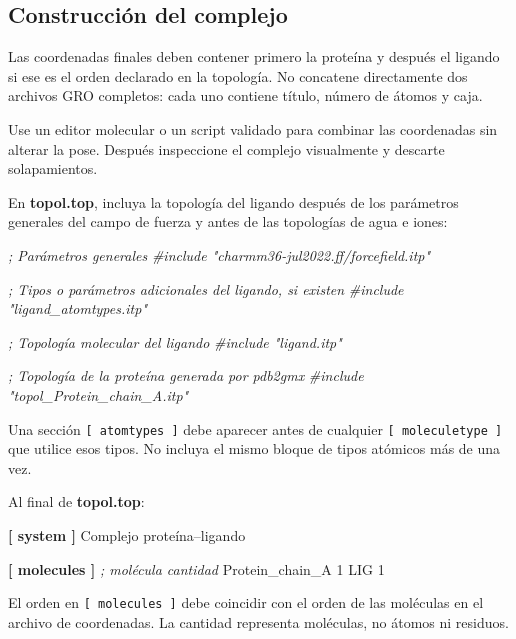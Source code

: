 \documentclass[
  spanish,
  11pt,
  a4paper]{article}
\newenvironment{Shaded}{\begin{snugshade}}{\end{snugshade}}
\newcommand{\CommentTok}[1]{\textcolor[rgb]{0.56,0.35,0.01}{\textit{#1}}}
\newcommand{\DataTypeTok}[1]{\textcolor[rgb]{0.13,0.29,0.53}{#1}}
\newcommand{\KeywordTok}[1]{\textcolor[rgb]{0.13,0.29,0.53}{\textbf{#1}}}
\begin{document}
\subsection{Construcción del
complejo}\label{construcciuxf3n-del-complejo}

Las coordenadas finales deben contener primero la proteína y después el
ligando si ese es el orden declarado en la topología. No concatene
directamente dos archivos GRO completos: cada uno contiene título,
número de átomos y caja.

Use un editor molecular o un script validado para combinar las
coordenadas sin alterar la pose. Después inspeccione el complejo
visualmente y descarte solapamientos.

En \textbf{topol.top}, incluya la topología del ligando después de los
parámetros generales del campo de fuerza y antes de las topologías de
agua e iones:

\begin{Shaded}
\begin{Highlighting}[]
\CommentTok{; Parámetros generales}
\CommentTok{\#include "charmm36{-}jul2022.ff/forcefield.itp"}

\CommentTok{; Tipos o parámetros adicionales del ligando, si existen}
\CommentTok{\#include "ligand\_atomtypes.itp"}

\CommentTok{; Topología molecular del ligando}
\CommentTok{\#include "ligand.itp"}

\CommentTok{; Topología de la proteína generada por pdb2gmx}
\CommentTok{\#include "topol\_Protein\_chain\_A.itp"}
\end{Highlighting}
\end{Shaded}

Una sección \texttt{{[}\ atomtypes\ {]}} debe aparecer antes de
cualquier \texttt{{[}\ moleculetype\ {]}} que utilice esos tipos. No
incluya el mismo bloque de tipos atómicos más de una vez.

Al final de \textbf{topol.top}:

\begin{Shaded}
\begin{Highlighting}[]
\KeywordTok{[ system ]}
\DataTypeTok{Complejo proteína–ligando}

\KeywordTok{[ molecules ]}
\CommentTok{; molécula          cantidad}
\DataTypeTok{Protein\_chain\_A     1}
\DataTypeTok{LIG                 1}
\end{Highlighting}
\end{Shaded}

El orden en \texttt{{[}\ molecules\ {]}} debe coincidir con el orden de
las moléculas en el archivo de coordenadas. La cantidad representa
moléculas, no átomos ni residuos.
\end{document}
